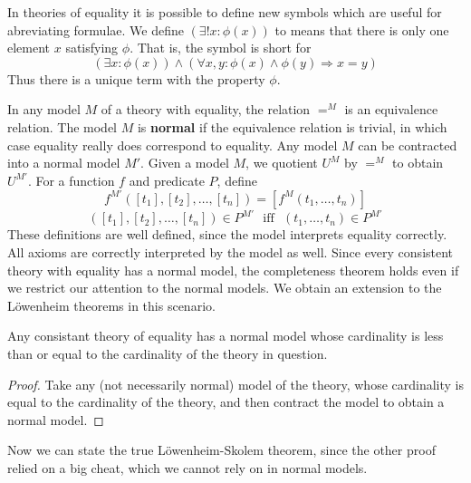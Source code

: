 In theories of equality it is possible to define new symbols which are useful for abreviating formulae. We define $(\exists ! x: \phi(x))$ to means that there is only one element $x$ satisfying $\phi$. That is, the symbol is short for
%
\[ (\exists x: \phi(x)) \wedge (\forall x,y: \phi(x) \wedge \phi(y) \Rightarrow x = y) \]
%
Thus there is a unique term with the property $\phi$.

In any model $M$ of a theory with equality, the relation $=^M$ is an equivalence relation. The model $M$ is {\bf normal} if the equivalence relation is trivial, in which case equality really does correspond to equality. Any model $M$ can be contracted into a normal model $M'$. Given a model $M$, we quotient $U^M$ by $=^M$ to obtain $U^{M'}$. For a function $f$ and predicate $P$, define
%
\[ f^{M'}([t_1],[t_2],\dots,[t_n]) = [f^M(t_1, \dots, t_n)] \]
%
\[ ([t_1],[t_2],\dots,[t_n]) \in P^{M'}\ \ \ \text{iff}\ \ \ (t_1, \dots, t_n) \in P^{M'} \]
%
These definitions are well defined, since the model interprets equality correctly. All axioms are correctly interpreted by the model as well. Since every consistent theory with equality has a normal model, the completeness theorem holds even if we restrict our attention to the normal models. We obtain an extension to the L\"{o}wenheim theorems in this scenario.

\begin{prop}
    Any consistant theory of equality has a normal model whose cardinality is less than or equal to the cardinality of the theory in question.
\end{prop}
\begin{proof}
    Take any (not necessarily normal) model of the theory, whose cardinality is equal to the cardinality of the theory, and then contract the model to obtain a normal model.
\end{proof}

Now we can state the true L\"{o}wenheim-Skolem theorem, since the other proof relied on a big cheat, which we cannot rely on in normal models.

